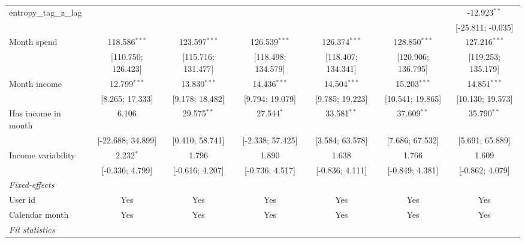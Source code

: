 \begin{table}[htbp]
\begin{threeparttable}[b]
\begin{tabular}{lcccccc}
         entropy\_tag\_z\_lag            &                    &                    &                    &                    &                    & -12.923$^{**}$\\   
                                         &                    &                    &                    &                    &                    & [-25.811; -0.035]\\   
         Month spend                     & 118.586$^{***}$    & 123.597$^{***}$    & 126.539$^{***}$    & 126.374$^{***}$    & 128.850$^{***}$    & 127.216$^{***}$\\   
                                         & [110.750; 126.423] & [115.716; 131.477] & [118.498; 134.579] & [118.407; 134.341] & [120.906; 136.795] & [119.253; 135.179]\\   
         Month income                    & 12.799$^{***}$     & 13.830$^{***}$     & 14.436$^{***}$     & 14.504$^{***}$     & 15.203$^{***}$     & 14.851$^{***}$\\   
                                         & [8.265; 17.333]    & [9.178; 18.482]    & [9.794; 19.079]    & [9.785; 19.223]    & [10.541; 19.865]   & [10.130; 19.573]\\   
         Has income in month             & 6.106              & 29.575$^{**}$      & 27.544$^{*}$       & 33.581$^{**}$      & 37.609$^{**}$      & 35.790$^{**}$\\   
                                         & [-22.688; 34.899]  & [0.410; 58.741]    & [-2.338; 57.425]   & [3.584; 63.578]    & [7.686; 67.532]    & [5.691; 65.889]\\   
         Income variability              & 2.232$^{*}$        & 1.796              & 1.890              & 1.638              & 1.766              & 1.609\\   
                                         & [-0.336; 4.799]    & [-0.616; 4.207]    & [-0.736; 4.517]    & [-0.836; 4.111]    & [-0.849; 4.381]    & [-0.862; 4.079]\\   
         \midrule
         \emph{Fixed-effects}\\
         User id                         & Yes                & Yes                & Yes                & Yes                & Yes                & Yes\\  
         Calendar month                  & Yes                & Yes                & Yes                & Yes                & Yes                & Yes\\  
         \midrule
         \emph{Fit statistics}\\

\end{tabular}
\end{threeparttable}
\end{table}
